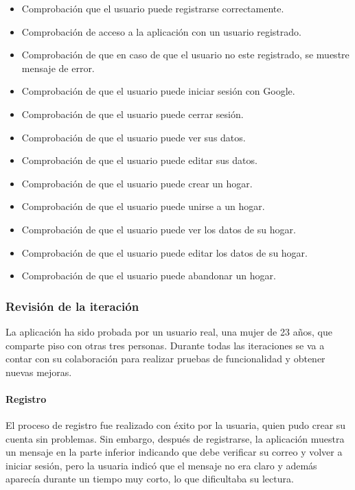 \begin{itemize}
    \item Comprobación que el usuario puede registrarse correctamente.
    \item Comprobación de acceso a la aplicación con un usuario registrado.
    \item Comprobación de que en caso de que el usuario no este registrado, se muestre mensaje de error.
    \item Comprobación de que el usuario puede iniciar sesión con Google.
    \item Comprobación de que el usuario puede cerrar sesión.
    \item Comprobación de que el usuario puede ver sus datos.
    \item Comprobación de que el usuario puede editar sus datos.
    \item Comprobación de que el usuario puede crear un hogar.
    \item Comprobación de que el usuario puede unirse a un hogar.
    \item Comprobación de que el usuario puede ver los datos de su hogar.
    \item Comprobación de que el usuario puede editar los datos de su hogar.
    \item Comprobación de que el usuario puede abandonar un hogar.
\end{itemize}

\subsubsection{Revisión de la iteración}
La aplicación ha sido probada por un usuario real, una mujer de 23 años, que comparte piso con otras tres personas.
Durante todas las iteraciones se va a contar con su colaboración para realizar pruebas de funcionalidad y obtener
nuevas mejoras.

\paragraph{Registro}

\parbox{\textwidth}{ 
   
}

El proceso de registro fue realizado con éxito por la usuaria, quien pudo crear su cuenta sin problemas. Sin 
embargo, después de registrarse, la aplicación muestra un mensaje en la parte inferior indicando 
que debe verificar su correo y volver a iniciar sesión, pero la usuaria indicó que el mensaje no era claro y 
además aparecía durante un tiempo muy corto, lo que dificultaba su lectura.

